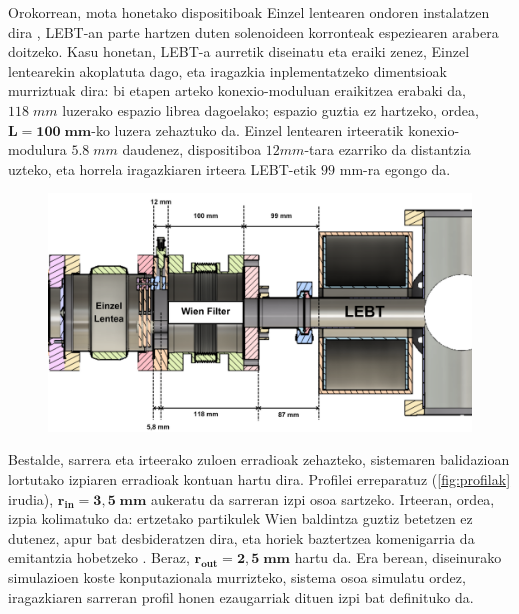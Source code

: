 \documentclass[12pt]{article}
\numberwithin{figure}{section}
\numberwithin{equation}{section}
\begin{document}
Orokorrean, mota honetako dispositiboak Einzel lentearen ondoren instalatzen dira \cite{asaji_development_2019, storey_filtering_2024}, LEBT-an parte hartzen duten solenoideen korronteak espeziearen arabera doitzeko. Kasu honetan, LEBT-a aurretik diseinatu eta eraiki zenez, Einzel lentearekin akoplatuta dago, eta iragazkia inplementatzeko dimentsioak murriztuak dira: bi etapen arteko konexio-moduluan eraikitzea erabaki da, $118\;mm$ luzerako espazio librea dagoelako; espazio guztia ez hartzeko, ordea, $\mathbf{L=100\;mm}$-ko luzera zehaztuko da. Einzel lentearen irteeratik konexio-modulura $\num{5.8}\;mm$ daudenez, dispositiboa $12 mm$-tara ezarriko da distantzia uzteko, eta horrela iragazkiaren irteera LEBT-etik $\num{99}$ mm-ra egongo da.\\

\begin{figure}[h]
    \centering
    \includegraphics[width=\linewidth]{4 - Diseinua/wien_filter_position.png}
    \caption{}
    \label{fig:wien_position}
\end{figure}

Bestalde, sarrera eta irteerako zuloen erradioak zehazteko, sistemaren balidazioan lortutako izpiaren erradioak kontuan hartu dira. Profilei erreparatuz (\ref{fig:profilak} irudia), $\mathbf{r_{in}=3,5\;mm}$ aukeratu da sarreran izpi osoa sartzeko. Irteeran, ordea, izpia kolimatuko da: ertzetako partikulek Wien baldintza guztiz betetzen ez dutenez, apur bat desbideratzen dira, eta horiek baztertzea komenigarria da emitantzia hobetzeko \cite{zhang_beam_2012}. Beraz, $\mathbf{r_{out}=2,5\;mm}$ hartu da. Era berean, diseinurako simulazioen koste konputazionala murrizteko, sistema osoa simulatu ordez, iragazkiaren sarreran profil honen ezaugarriak dituen izpi bat definituko da.
\newpage
\end{document}
